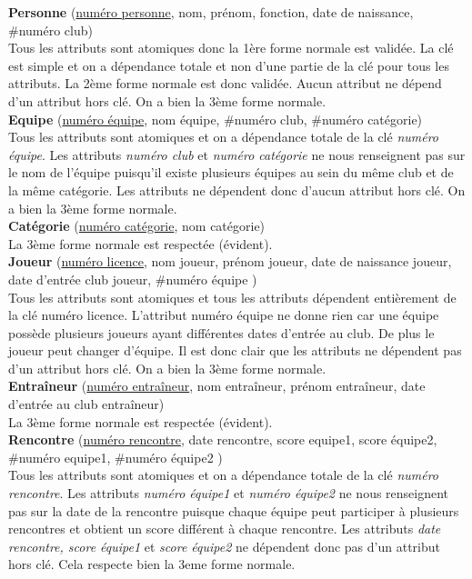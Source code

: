 \documentclass{article}
\begin{document}
\textbf{Personne} (\underline{numéro personne}, nom, prénom, fonction, date de naissance, \#numéro club) \\
Tous les attributs sont atomiques donc la 1ère forme normale est validée. La clé est simple et on a dépendance totale et non d'une partie de la clé pour tous les attributs. La 2ème forme normale est donc validée.  Aucun attribut ne dépend d'un attribut hors clé. On a bien la 3ème forme normale. \\

\textbf{Equipe} (\underline{numéro équipe}, nom équipe, \#numéro club, \#numéro catégorie) \\
Tous les attributs sont atomiques et on a dépendance totale de la clé \emph{numéro équipe}. Les attributs \emph{numéro club} et \emph{numéro catégorie} ne nous renseignent pas sur le nom de l'équipe puisqu'il existe plusieurs équipes au sein du même club et de la même catégorie. Les attributs ne dépendent donc d'aucun attribut hors clé. On a bien la 3ème forme normale. \\

\textbf{Catégorie} (\underline{numéro catégorie}, nom catégorie)\\
La 3ème forme normale est respectée (évident). \\

\textbf{Joueur} (\underline{numéro licence}, nom joueur, prénom joueur, date de naissance joueur, date d'entrée club joueur, \#numéro équipe ) \\
Tous les attributs sont atomiques et tous les attributs dépendent entièrement de la clé numéro licence. L'attribut numéro équipe ne donne rien car une équipe possède plusieurs joueurs ayant différentes dates d'entrée au club. De plus le joueur peut changer d'équipe. Il est donc clair que les attributs ne dépendent pas d'un attribut hors clé. On a bien la 3ème forme normale. \\

\textbf{Entraîneur} (\underline{numéro entraîneur}, nom entraîneur, prénom entraîneur, date d'entrée au club entraîneur) \\
La 3ème forme normale est respectée (évident). \\

\textbf{Rencontre} (\underline{numéro rencontre}, date rencontre, score equipe1, score équipe2, \#numéro equipe1, \#numéro équipe2 ) \\
Tous les attributs sont atomiques et on a dépendance totale de la clé \emph{numéro rencontre}. Les attributs \emph{numéro équipe1} et \emph{numéro équipe2} ne nous renseignent pas sur la date de la rencontre puisque chaque équipe peut participer à plusieurs rencontres et obtient un score différent à chaque rencontre. Les attributs \emph{date rencontre, score équipe1} et \emph{score équipe2} ne dépendent donc pas d'un attribut hors clé. Cela respecte bien la 3eme forme normale. \\
\end{document}
